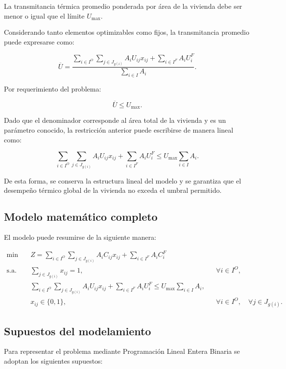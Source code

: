 \documentclass[journal, 12pt, onecolumn]{IEEEtran}
\begin{document}
La transmitancia térmica promedio ponderada por área de la vivienda debe
ser menor o igual que el límite $U_{\max}$.

Considerando tanto elementos optimizables como fijos, la transmitancia promedio
puede expresarse como:

\[
\overline{U} =
\frac{
\displaystyle
\sum_{i\in I^{O}}
\sum_{j\in J_{g(i)}}
A_iU_{ij}x_{ij}
+
\sum_{i\in I^{F}}
A_iU_i^{F}
}{
\displaystyle
\sum_{i\in I}A_i
}.
\]

Por requerimiento del problema:

\[
\overline{U}\leq U_{\max}.
\]

Dado que el denominador corresponde al área total de la vivienda y es un
parámetro conocido, la restricción anterior puede escribirse de manera
lineal como:

\[
\sum_{i\in I^{O}}
\sum_{j\in J_{g(i)}}
A_iU_{ij}x_{ij}
+
\sum_{i\in I^{F}}
A_iU_i^{F}
\leq
U_{\max}
\sum_{i\in I}A_i.
\]

De esta forma, se conserva la estructura lineal del modelo y se garantiza que
el desempeño térmico global de la vivienda no exceda el umbral permitido.

\subsection{Modelo matemático completo}

El modelo puede resumirse de la siguiente manera:

\[
\boxed{
\begin{aligned}
\min \quad
& Z=
\sum_{i\in I^{O}}
\sum_{j\in J_{g(i)}}
A_iC_{ij}x_{ij}
+
\sum_{i\in I^{F}}
A_iC_i^{F}
\\[2mm]
\text{s.a.}\quad
& \sum_{j\in J_{g(i)}}x_{ij}=1,
&& \forall i\in I^{O},
\\[2mm]
&
\sum_{i\in I^{O}}
\sum_{j\in J_{g(i)}}
A_iU_{ij}x_{ij}
+
\sum_{i\in I^{F}}
A_iU_i^{F}
\leq
U_{\max}
\sum_{i\in I}A_i,
\\[2mm]
& x_{ij}\in\{0,1\},
&& \forall i\in I^{O},
\quad \forall j\in J_{g(i)}.
\end{aligned}
}
\]

\subsection{Supuestos del modelamiento}

Para representar el problema mediante Programación Lineal Entera Binaria se
adoptan los siguientes supuestos:
\end{document}
